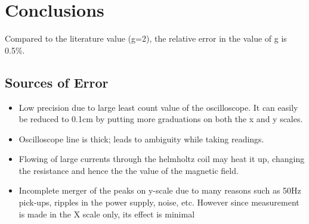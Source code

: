 \section{Conclusions}
	Compared to the literature value (g=2), the relative error in the value of g is 0.5\%.

	\subsection{Sources of Error}
		\begin{itemize}
			\item Low precision due to large least count value of the oscilloscope. It can easily be reduced to 0.1cm by putting more graduations on both the x and y scales.
			\item Oscilloscope line is thick; leads to ambiguity while taking readings.
			\item Flowing of large currents through the helmholtz coil may heat it up, changing the resistance and hence the the value of the magnetic field.
			\item Incomplete merger of the peaks on y-scale due to many reasons such as 50Hz pick-ups, ripples in the power supply, noise, etc. However since measurement is made in the X scale only, its effect is minimal
		\end{itemize}